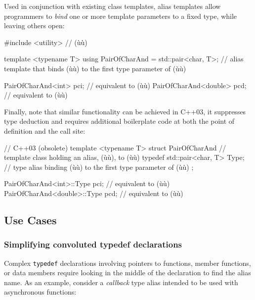\noindent Used in conjunction with existing class templates, alias templates allow
programmers to \emph{bind} one or more template parameters to a fixed
type, while leaving others open:

\begin{emcppslisting}[language=C++]
#include <utility>  // (ù{}ù)

template <typename T>
using PairOfCharAnd = std::pair<char, T>;
    // alias template that binds (ù{}ù) to the first type parameter of (ù{}ù)

PairOfCharAnd<int>    pci;  // equivalent to (ù{}ù)
PairOfCharAnd<double> pcd;  // equivalent to (ù{}ù)
\end{emcppslisting}

\noindent Finally, note that similar functionality can be
achieved in C++03, it suppresses type deduction and requires additional boilerplate code at both the
point of definition and the call site:

\begin{emcppslisting}[language=C++]
// C++03 (obsolete)
template <typename T>
struct PairOfCharAnd
    // template class holding an alias, (ù{}ù), to (ù{}ù)
{
    typedef std::pair<char, T> Type;
        // type alias binding (ù{}ù) to the first type parameter of (ù{}ù)
};

PairOfCharAnd<int>::Type    pci;  // equivalent to (ù{}ù)
PairOfCharAnd<double>::Type pcd;  // equivalent to (ù{}ù)
\end{emcppslisting}


\subsection[Use Cases]{Use Cases}\label{use-cases}

\subsubsection[Simplifying convoluted \lstinline!typedef! declarations]{Simplifying convoluted {\SubsubsecCode typedef} declarations}\label{simplifying-convoluted-typedef-declarations}

Complex \lstinline!typedef! declarations involving pointers to functions,
member functions, or data members require looking in the middle of the
declaration to find the alias name. As an example, consider a
\emph{callback} type alias intended to be used with asynchronous functions:

